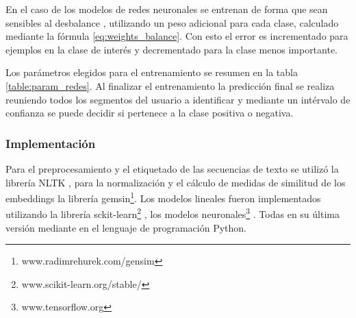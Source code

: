 En el caso de los modelos de redes neuronales se entrenan de forma que sean sensibles al desbalance \cite{wang2016training}, utilizando un peso adicional para cada clase, calculado mediante la fórmula \ref{eq:weights_balance}. Con esto el error es incrementado para ejemplos en la clase de interés y decrementado para la clase menos importante.

Los parámetros elegidos para el entrenamiento se resumen en la tabla \ref{table:param_redes}. Al finalizar el entrenamiento la predicción final se realiza reuniendo todos los segmentos del usuario a identificar y mediante un intérvalo de confianza se puede decidir si pertenece a la clase positiva o negativa.



\subsubsection{Implementación}
Para el preprocesamiento y el etiquetado de las secuencias de texto se utilizó la librería NLTK \cite{loper2002nltk}, para la normalización y el cálculo de medidas de similitud de los embeddings la librería gemsin\footnote{www.radimrehurek.com/gensim}.
Los modelos lineales fueron implementados utilizando la librería sckit-learn\footnote{www.scikit-learn.org/stable/} \cite{scikitlearn}, los modelos neuronales\footnote{www.tensorflow.org} \cite{tensorflow2015whitepaper}. Todas en su última versión mediante en el lenguaje de programación Python.
